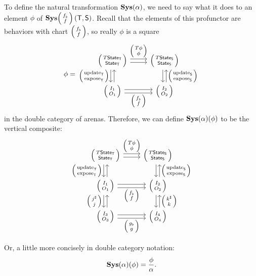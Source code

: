 \documentclass[DynamicalBook]{subfiles}
\begin{document}
To define the natural transformation $\textbf{Sys}(\alpha)$, we need to say what it
does to an element $\phi$ of $\Cat{Sys}\lens{f_{\flat}}{f}\left(\Sys{T},
  \Sys{S}\right)$. Recall that the elements of this profunctor are behaviors with
  chart $\lens{f_{\flat}}{f}$, so really $\phi$ is a square
\[
  \phi =
    \begin{tikzcd}
      \lens{T\State{T}}{\State{T}} \ar[r, shift left, "\lens{T\phi}{\phi}"] \ar[r, shift right] \ar[d, shift right,
      "\lens{\update{T}}{\expose{T}}"'] \ar[d, shift left, leftarrow] &
      \lens{T\State{S}}{\State{S}} \ar[d, shift left, leftarrow,
      "\lens{\update{S}}{\expose{S}}"] \ar[d, shift right]\\
      \lens{I_1}{O_1} \ar[r, shift right, "\lens{f_{\flat}}{f}"'] \ar[r,
      shift left] & \lens{I_2}{O_2}
    \end{tikzcd}
\]
in the double category of arenas. Therefore, we can define
$\textbf{Sys}(\alpha)(\phi)$ to be the vertical composite:
\[
  \begin{tikzcd}
    \lens{T\State{T}}{\State{T}} \ar[r, shift left, "\lens{T\phi}{\phi}"] \ar[r, shift right] \ar[d, shift right,
    "\lens{\update{T}}{\expose{T}}"'] \ar[d, shift left, leftarrow] &
    \lens{T\State{S}}{\State{S}} \ar[d, shift left, leftarrow,
    "\lens{\update{S}}{\expose{S}}"] \ar[d, shift right]\\
    \lens{I_1}{O_1} \ar[d, shift right, "\lens{j^{\sharp}}{j}"'] \ar[d, shift left,
        leftarrow] \ar[r, shift right, "\lens{f_{\flat}}{f}"']
    \ar[r, shift left] & \lens{I_2}{O_2} \ar[d, shift left, leftarrow,
        "\lens{k^{\sharp}}{k}"] \ar[d, shift right]\\
    \lens{I_3}{O_3} \ar[r, shift right, "\lens{g_{\flat}}{g}"']
    \ar[r, shift left] & \lens{I_4}{O_4} \\
  \end{tikzcd}
\]
Or, a little more concisely in double category notation:
$$\textbf{Sys}(\alpha)(\phi) = \frac{\phi}{\alpha}.$$
\end{document}
